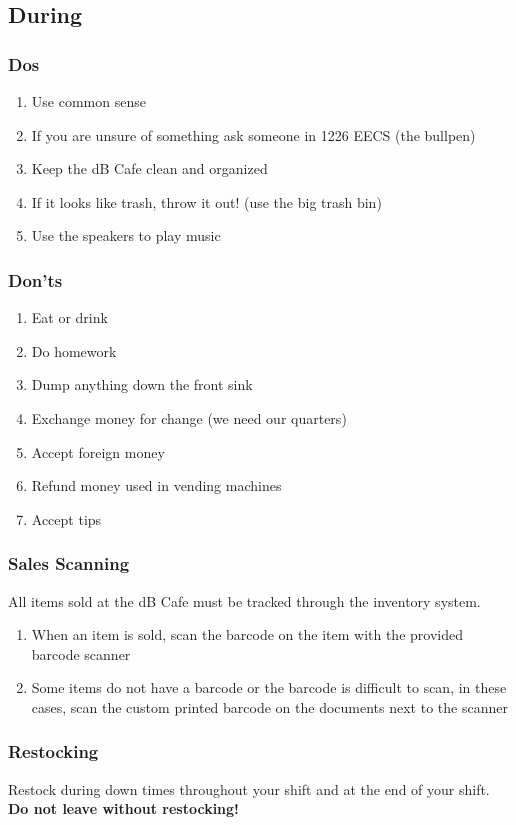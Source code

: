 \documentclass[12pt,onecolumn,letterpaper]{article}
\begin{document}
\subsection{During}
\subsubsection{Dos}
\begin{enumerate}
\item Use common sense
\item If you are unsure of something ask someone in 1226 EECS (the bullpen)
\item Keep the dB Cafe clean and organized
\item If it looks like trash, throw it out! (use the big trash bin)
\item Use the speakers to play music
\end{enumerate}
\subsubsection{Don'ts}
\begin{enumerate}
\item Eat or drink
\item Do homework
\item Dump anything down the front sink
\item Exchange money for change (we need our quarters)
\item Accept foreign money
\item Refund money used in vending machines
\item Accept tips
\end{enumerate}
\subsubsection{Sales Scanning}
All items sold at the dB Cafe must be tracked through the inventory system. 
\begin{enumerate}
\item When an item is sold, scan the barcode on the item with the provided barcode scanner
\item Some items do not have a barcode or the barcode is difficult to scan, in these cases, scan the custom printed barcode on the documents next to the scanner
\end{enumerate}
\subsubsection{Restocking}
Restock during down times throughout your shift and at the end of your shift. \textbf{Do not leave without restocking!}
\end{document}
